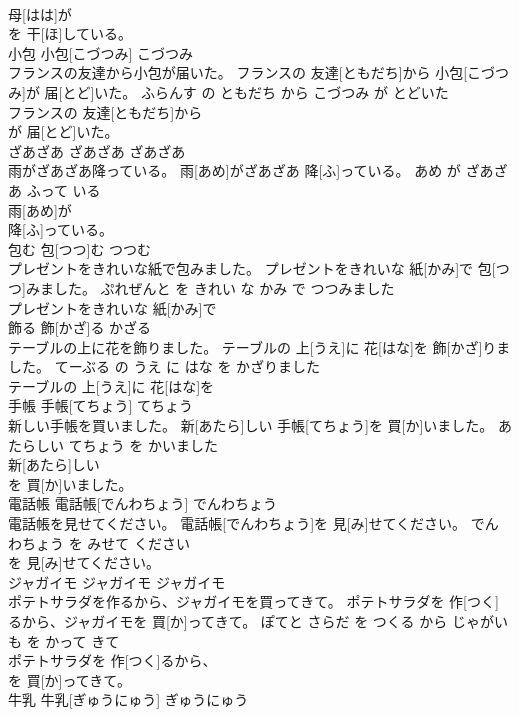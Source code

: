 \documentclass[8pt]{extreport}
\begin{document}
\begin{CJK}{UTF8}{min}
\\	母[はは]が
\\	を 干[ほ]している。			
\\	小包	小包[こづつみ]	こづつみ	
\\	フランスの友達から小包が届いた。	フランスの 友達[ともだち]から 小包[こづつみ]が 届[とど]いた。	ふらんす の ともだち から こづつみ が とどいた	
\\	フランスの 友達[ともだち]から
\\	が 届[とど]いた。			
\\	ざあざあ	ざあざあ	ざあざあ	
\\	雨がざあざあ降っている。	雨[あめ]がざあざあ 降[ふ]っている。	あめ が ざあざあ ふって いる	
\\	雨[あめ]が
\\	降[ふ]っている。			
\\	包む	包[つつ]む	つつむ	
\\	プレゼントをきれいな紙で包みました。	プレゼントをきれいな 紙[かみ]で 包[つつ]みました。	ぷれぜんと を きれい な かみ で つつみました	
\\	プレゼントをきれいな 紙[かみ]で
\\	飾る	飾[かざ]る	かざる	
\\	テーブルの上に花を飾りました。	テーブルの 上[うえ]に 花[はな]を 飾[かざ]りました。	てーぶる の うえ に はな を かざりました	
\\	テーブルの 上[うえ]に 花[はな]を
\\	手帳	手帳[てちょう]	てちょう	
\\	新しい手帳を買いました。	新[あたら]しい 手帳[てちょう]を 買[か]いました。	あたらしい てちょう を かいました	
\\	新[あたら]しい
\\	を 買[か]いました。			
\\	電話帳	電話帳[でんわちょう]	でんわちょう	
\\	電話帳を見せてください。	電話帳[でんわちょう]を 見[み]せてください。	でんわちょう を みせて ください	
\\	を 見[み]せてください。			
\\	ジャガイモ	ジャガイモ	ジャガイモ	
\\	ポテトサラダを作るから、ジャガイモを買ってきて。	ポテトサラダを 作[つく]るから、ジャガイモを 買[か]ってきて。	ぽてと さらだ を つくる から じゃがいも を かって きて	
\\	ポテトサラダを 作[つく]るから、
\\	を 買[か]ってきて。			
\\	牛乳	牛乳[ぎゅうにゅう]	ぎゅうにゅう	

\end{CJK}
\end{document}
